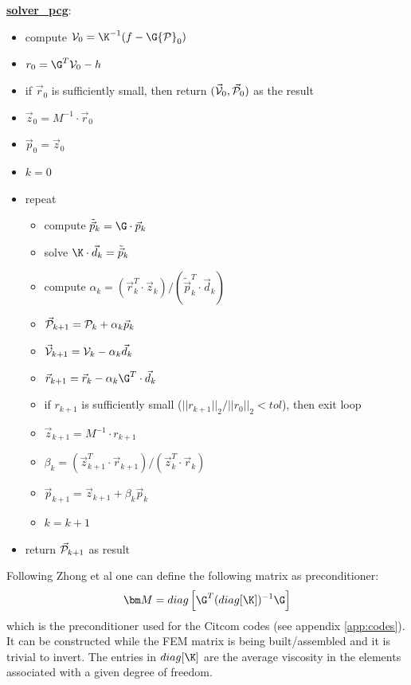\begin{mdframed}[backgroundcolor=blue!5]
\underline{\bf solver\_pcg}:
\begin{itemize}
\item compute ${\cal V}_0=\K^{-1}(f-\G{\cal P}_0)$
\item $r_0 = \G^T {\cal V}_0 - h$
\item if $\vec{r}_0$ is sufficiently small, then return $(\vec{\cal V}_0,\vec{\cal P}_0)$ as the result
\item $\vec{z}_0= M^{-1} \cdot \vec{r}_0$ 
\item $\vec{p}_0=\vec{z}_0$
\item $k=0$
\item repeat
\begin{itemize}
\item compute $\tilde{\vec{p}}_k = \G \cdot \vec{p}_k$
\item solve $\K\cdot  \vec{d}_k = \tilde{\vec{p}}_k$
\item compute $\alpha_k=(\vec{r}_k^T \cdot \vec{z}_k)/(\tilde{\vec{p}}_k^T \cdot \vec{d}_k)$
\item $\vec{\cal P}_{k+1} = {\cal P}_k+\alpha_k \vec{p}_k$
\item $\vec{\cal V}_{k+1} = {\cal V}_k - \alpha_k \vec{d}_k$
\item $\vec{r}_{k+1} = \vec{r}_k - \alpha_k \G^T \cdot \vec{d}_k $
\item if $r_{k+1}$ is sufficiently small ($||r_{k+1}||_2/||r_0||_2 <tol$), then exit loop
\item $\vec{z}_{k+1}=M^{-1} \cdot r_{k+1}$
\item $\beta_k=(\vec{z}_{k+1}^T \cdot  \vec{r}_{k+1})/(\vec{z}_k^T \cdot  \vec{r}_k)$
\item $\vec{p}_{k+1} =\vec{z}_{k+1}+ \beta_k \vec{p}_k$
\item $k=k+1$
\end{itemize}
\item return $\vec{\cal P}_{k+1}$ as result
\end{itemize}
\end{mdframed}

Following Zhong et al \cite{zhym12} one can define the following matrix as preconditioner:
\[
{\bm M} = diag \left[ \G^T (diag [\K]  )^{-1} \G \right]
\]
which is the preconditioner used for the Citcom codes (see appendix \ref{app:codes}). It 
can be constructed while the FEM matrix is being built/assembled
and it is trivial to invert. The entries in
$diag[\K]$ are the average viscosity in the elements associated
with a given degree of freedom.

